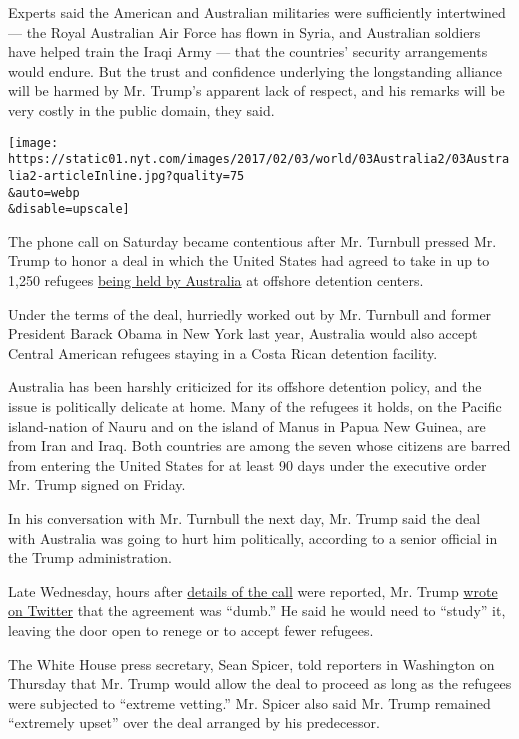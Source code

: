 Experts said the American and Australian militaries were sufficiently
intertwined --- the Royal Australian Air Force has flown in Syria, and
Australian soldiers have helped train the Iraqi Army --- that the
countries' security arrangements would endure. But the trust and
confidence underlying the longstanding alliance will be harmed by Mr.
Trump's apparent lack of respect, and his remarks will be very costly in
the public domain, they said.

\texttt{[image: https://static01.nyt.com/images/2017/02/03/world/03Australia2/03Australia2-articleInline.jpg?quality=75\\\&auto=webp\\\&disable=upscale]}

The phone call on Saturday became contentious after Mr. Turnbull pressed
Mr. Trump to honor a deal in which the United States had agreed to take
in up to 1,250 refugees
\href{https://www.nytimes.com/2016/12/09/opinion/sunday/australia-refugee-prisons-manus-island.html}{being
held by Australia} at offshore detention centers.

Under the terms of the deal, hurriedly worked out by Mr. Turnbull and
former President Barack Obama in New York last year, Australia would
also accept Central American refugees staying in a Costa Rican detention
facility.

Australia has been harshly criticized for its offshore detention policy,
and the issue is politically delicate at home. Many of the refugees it
holds, on the Pacific island-nation of Nauru and on the island of Manus
in Papua New Guinea, are from Iran and Iraq. Both countries are among
the seven whose citizens are barred from entering the United States for
at least 90 days under the executive order Mr. Trump signed on Friday.

In his conversation with Mr. Turnbull the next day, Mr. Trump said the
deal with Australia was going to hurt him politically, according to a
senior official in the Trump administration.

Late Wednesday, hours after
\href{https://www.washingtonpost.com/world/national-security/no-gday-mate-on-call-with-australian-pm-trump-badgers-and-brags/2017/02/01/88a3bfb0-e8bf-11e6-80c2-30e57e57e05d_story.html}{details
of the call} were reported, Mr. Trump
\href{https://twitter.com/realDonaldTrump/status/827002559122567168}{wrote
on Twitter} that the agreement was ``dumb.'' He said he would need to
``study'' it, leaving the door open to renege or to accept fewer
refugees.

The White House press secretary, Sean Spicer, told reporters in
Washington on Thursday that Mr. Trump would allow the deal to proceed as
long as the refugees were subjected to ``extreme vetting.'' Mr. Spicer
also said Mr. Trump remained ``extremely upset'' over the deal arranged
by his predecessor.

